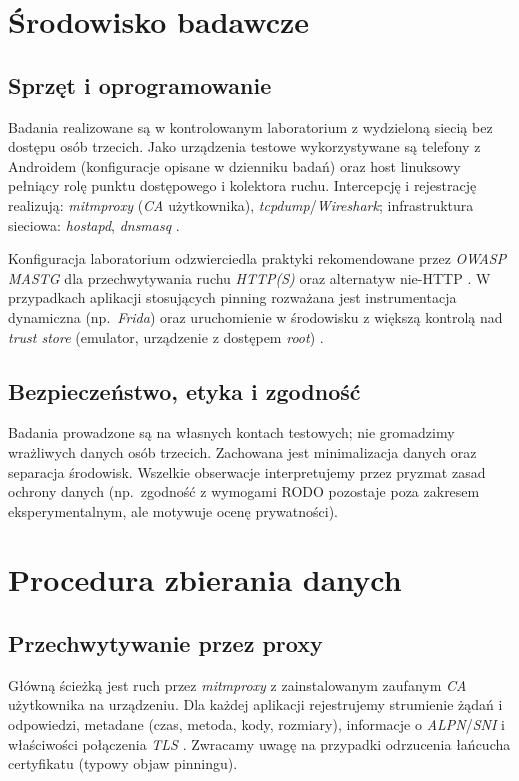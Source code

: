 \section{Środowisko badawcze}

\subsection{Sprzęt i oprogramowanie}
Badania realizowane są w kontrolowanym laboratorium z wydzieloną siecią bez dostępu osób trzecich. Jako urządzenia testowe wykorzystywane są telefony z Androidem (konfiguracje opisane w dzienniku badań) oraz host linuksowy pełniący rolę punktu dostępowego i kolektora ruchu. Intercepcję i rejestrację realizują: \textit{mitmproxy} (\emph{CA} użytkownika), \textit{tcpdump}/\textit{Wireshark}; infrastruktura sieciowa: \textit{hostapd}, \textit{dnsmasq} \cite{MitmproxyDocs,WiresharkDocs}. 
\vspace{2mm}

\noindent Konfiguracja laboratorium odzwierciedla praktyki rekomendowane przez \emph{OWASP MASTG} dla przechwytywania ruchu \emph{HTTP(S)} oraz alternatyw nie-HTTP \cite{OWASPMASTGIntercept}. W przypadkach aplikacji stosujących pinning rozważana jest instrumentacja dynamiczna (np.\ \textit{Frida}) oraz uruchomienie w środowisku z większą kontrolą nad \emph{trust store} (emulator, urządzenie z dostępem \textit{root}) \cite{Frida,OWASPMASTGPinning}.

\subsection{Bezpieczeństwo, etyka i zgodność}
Badania prowadzone są na własnych kontach testowych; nie gromadzimy wrażliwych danych osób trzecich. Zachowana jest minimalizacja danych oraz separacja środowisk. Wszelkie obserwacje interpretujemy przez pryzmat zasad ochrony danych (np.\ zgodność z wymogami RODO pozostaje poza zakresem eksperymentalnym, ale motywuje ocenę prywatności).

\section{Procedura zbierania danych}

\subsection{Przechwytywanie przez proxy}
Główną ścieżką jest ruch przez \textit{mitmproxy} z zainstalowanym zaufanym \emph{CA} użytkownika na urządzeniu. Dla każdej aplikacji rejestrujemy strumienie żądań i odpowiedzi, metadane (czas, metoda, kody, rozmiary), informacje o \emph{ALPN}/\emph{SNI} i właściwości połączenia \emph{TLS} \cite{MitmproxyDocs,OWASPMASTGIntercept}. Zwracamy uwagę na przypadki odrzucenia łańcucha certyfikatu (typowy objaw pinningu).

